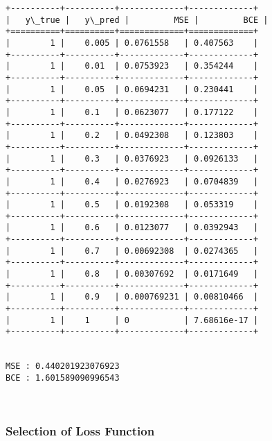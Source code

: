 \documentclass[11pt]{article}
\begin{document}
    \begin{Verbatim}[commandchars=\\\{\}]
+----------+----------+-------------+-------------+
|   y\_true |   y\_pred |         MSE |         BCE |
+==========+==========+=============+=============+
|        1 |    0.005 | 0.0761558   | 0.407563    |
+----------+----------+-------------+-------------+
|        1 |    0.01  | 0.0753923   | 0.354244    |
+----------+----------+-------------+-------------+
|        1 |    0.05  | 0.0694231   | 0.230441    |
+----------+----------+-------------+-------------+
|        1 |    0.1   | 0.0623077   | 0.177122    |
+----------+----------+-------------+-------------+
|        1 |    0.2   | 0.0492308   | 0.123803    |
+----------+----------+-------------+-------------+
|        1 |    0.3   | 0.0376923   | 0.0926133   |
+----------+----------+-------------+-------------+
|        1 |    0.4   | 0.0276923   | 0.0704839   |
+----------+----------+-------------+-------------+
|        1 |    0.5   | 0.0192308   | 0.053319    |
+----------+----------+-------------+-------------+
|        1 |    0.6   | 0.0123077   | 0.0392943   |
+----------+----------+-------------+-------------+
|        1 |    0.7   | 0.00692308  | 0.0274365   |
+----------+----------+-------------+-------------+
|        1 |    0.8   | 0.00307692  | 0.0171649   |
+----------+----------+-------------+-------------+
|        1 |    0.9   | 0.000769231 | 0.00810466  |
+----------+----------+-------------+-------------+
|        1 |    1     | 0           | 7.68616e-17 |
+----------+----------+-------------+-------------+


MSE : 0.440201923076923
BCE : 1.601589090996543
    \end{Verbatim}

    \begin{center}
    \end{center}
    { \hspace*{\fill} \\}
    
    \subsubsection{Selection of Loss
Function}\label{selection-of-loss-function}
\end{document}
